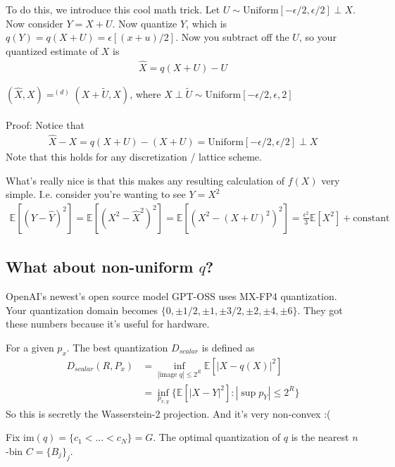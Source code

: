 To do this, we introduce this cool math trick. Let $U \sim \text{Uniform}[-\epsilon/2, \epsilon/2] \perp X$. Now consider $Y = X+ U$. Now quantize $Y$, which is $q(Y) = q(X+U) = \epsilon[(x+u)/2]$. Now you subtract off the $U$, so your quantized estimate of $X$ is
\begin{align}
	\hat X = q(X+U) - U
\end{align}

\begin{proposition}
	 $(\hat X, X) =^{(d)} (X+ \tilde U, X)$, where $X \perp \tilde U \sim \text{Uniform}[-\epsilon/2,\epsilon,2]$
	\\
	\\
	Proof: Notice that
	\begin{align}
		\hat X - X = q(X +U ) - (X+U) = \text{Uniform}[-\epsilon/2, \epsilon/2] \perp X
	\end{align}
	Note that this holds for any discretization / lattice scheme.
\end{proposition}
What's really nice is that this makes any resulting calculation of $f(X)$ very simple. I.e. consider you're wanting to see $Y = X^2$
\begin{align}
	\mathbb E[(Y - \hat Y)^2] = \mathbb E[(X^2 - \hat X^2)^2] = \mathbb E[(X^2 - (X+U)^2)^2] = \frac{\epsilon^2}{3}\mathbb E[X^2] + \text{constant}
\end{align}

\subsection{What about non-uniform $q$?}
OpenAI's newest's open source model GPT-OSS uses MX-FP4 quantization. Your quantization domain becomes $\{0, \pm 1/2, \pm 1, \pm 3/2, \pm 2, \pm 4, \pm 6 \}$. They got these numbers because it's useful for hardware.


\begin{definition}
	For a given $p_x$. The best quantization $D_{scalar}$ is defined as
	\begin{align}
		D_{scalar} (R, P_x) & = \inf_{|\text{image } q| \leq 2^R} \mathbb E[|X-q(X)|^2]\\
		& = \inf_{p_{x,y}} \{ \mathbb E[|X-Y|^2] : |\sup p_Y| \leq 2^R\}
	\end{align}
	So this is secretly the Wasserstein-2 projection. And it's very non-convex :(
\end{definition}


Fix $\text{im}(q) = \{c_1 <  ... < c_N\} = G$. The optimal quantization of $q$ is the nearest $n$-bin $C = \{B_j\}_j$. 

